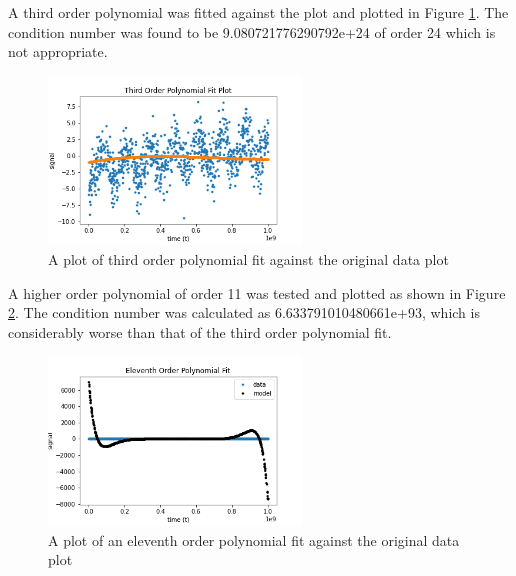 \documentclass[11pt]{article}
\begin{document}
A third order polynomial was fitted against the plot and plotted in Figure \ref{fig:third order polynomial fit}. The condition number was found to be 9.080721776290792e+24 of order 24 which is not appropriate.
\\

\begin{figure}[htp]\begin{center} 
		\vspace{12pt}
		\includegraphics[width=0.6\textwidth]{third order poly.png}
		\caption{A plot of third order polynomial fit against the original data plot  }
		\label{fig:third order polynomial fit} 
	\end{center}
\end{figure} 

A higher order polynomial of order 11 was tested and plotted as shown in Figure \ref{fig:eleventh order polynomial fit}. The condition number was calculated as 6.633791010480661e+93, which is considerably worse than that of the third order polynomial fit.

\begin{figure}[htp]\begin{center} 
		\vspace{12pt}
		\includegraphics[width=0.6\textwidth]{eleventh order polynomial.png}
		\caption{A plot of an eleventh order polynomial fit against the original data plot }
		\label{fig:eleventh order polynomial fit} 
	\end{center}
\end{figure} 
\end{document}
